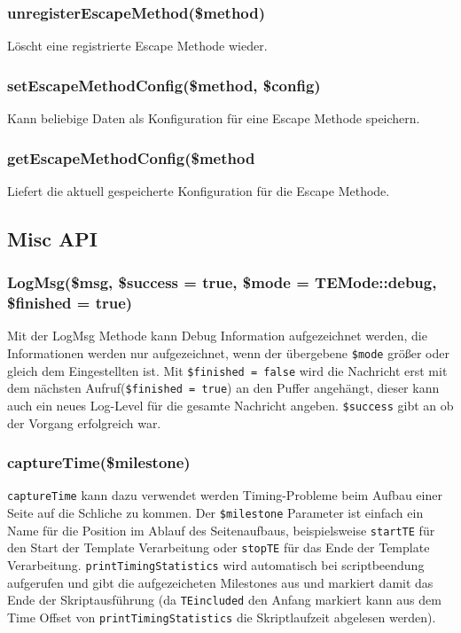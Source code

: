 \documentclass[a4paper,10pt]{article}
\begin{document}
\subsubsection{unregisterEscapeMethod(\$method)}
L\"oscht eine registrierte Escape Methode wieder.

\subsubsection{setEscapeMethodConfig(\$method, \$config)}
Kann beliebige Daten als Konfiguration f\"ur eine Escape Methode speichern.

\subsubsection{getEscapeMethodConfig(\$method}
Liefert die aktuell gespeicherte Konfiguration f\"ur die Escape Methode.

\subsection{Misc API}

\subsubsection{LogMsg(\$msg, \$success = true, \$mode = TEMode::debug, \$finished = true)}
Mit der LogMsg Methode kann Debug Information aufgezeichnet werden, die Informationen werden nur aufgezeichnet, wenn
der \"ubergebene {\tt \$mode} gr\"o\ss{}er oder gleich dem Eingestellten ist. Mit {\tt \$finished = false} wird die Nachricht
erst mit dem n\"achsten Aufruf({\tt \$finished = true}) an den Puffer angeh\"angt, dieser kann auch ein neues Log-Level f\"ur
die gesamte Nachricht angeben. {\tt \$success} gibt an ob der Vorgang erfolgreich war.

\subsubsection{captureTime(\$milestone)}
{\tt captureTime} kann dazu verwendet werden Timing-Probleme beim Aufbau einer Seite auf die Schliche zu kommen.
Der {\tt \$milestone} Parameter ist einfach ein Name f\"ur die Position im Ablauf des Seitenaufbaus,
beispielsweise {\tt startTE} f\"ur den Start der Template Verarbeitung oder {\tt stopTE} f\"ur das Ende der
Template Verarbeitung. {\tt printTimingStatistics} wird automatisch bei scriptbeendung aufgerufen und gibt die aufgezeicheten
Milestones aus und markiert damit das Ende der Skriptausf\"uhrung (da {\tt TEincluded} den Anfang markiert kann aus
dem Time Offset von {\tt printTimingStatistics} die Skriptlaufzeit abgelesen werden).
\end{document}
